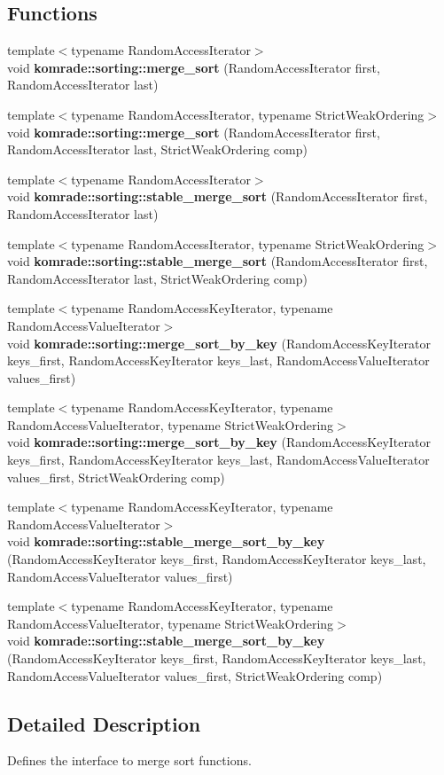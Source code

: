 \subsection*{Functions}
\begin{CompactItemize}
\item 
{\footnotesize template$<$typename RandomAccessIterator$>$ }\\void {\bf komrade::sorting::merge\_\-sort} (RandomAccessIterator first, RandomAccessIterator last)
\item 
{\footnotesize template$<$typename RandomAccessIterator, typename StrictWeakOrdering$>$ }\\void {\bf komrade::sorting::merge\_\-sort} (RandomAccessIterator first, RandomAccessIterator last, StrictWeakOrdering comp)
\item 
{\footnotesize template$<$typename RandomAccessIterator$>$ }\\void {\bf komrade::sorting::stable\_\-merge\_\-sort} (RandomAccessIterator first, RandomAccessIterator last)
\item 
{\footnotesize template$<$typename RandomAccessIterator, typename StrictWeakOrdering$>$ }\\void {\bf komrade::sorting::stable\_\-merge\_\-sort} (RandomAccessIterator first, RandomAccessIterator last, StrictWeakOrdering comp)
\item 
{\footnotesize template$<$typename RandomAccessKeyIterator, typename RandomAccessValueIterator$>$ }\\void {\bf komrade::sorting::merge\_\-sort\_\-by\_\-key} (RandomAccessKeyIterator keys\_\-first, RandomAccessKeyIterator keys\_\-last, RandomAccessValueIterator values\_\-first)
\item 
{\footnotesize template$<$typename RandomAccessKeyIterator, typename RandomAccessValueIterator, typename StrictWeakOrdering$>$ }\\void {\bf komrade::sorting::merge\_\-sort\_\-by\_\-key} (RandomAccessKeyIterator keys\_\-first, RandomAccessKeyIterator keys\_\-last, RandomAccessValueIterator values\_\-first, StrictWeakOrdering comp)
\item 
{\footnotesize template$<$typename RandomAccessKeyIterator, typename RandomAccessValueIterator$>$ }\\void {\bf komrade::sorting::stable\_\-merge\_\-sort\_\-by\_\-key} (RandomAccessKeyIterator keys\_\-first, RandomAccessKeyIterator keys\_\-last, RandomAccessValueIterator values\_\-first)
\item 
{\footnotesize template$<$typename RandomAccessKeyIterator, typename RandomAccessValueIterator, typename StrictWeakOrdering$>$ }\\void {\bf komrade::sorting::stable\_\-merge\_\-sort\_\-by\_\-key} (RandomAccessKeyIterator keys\_\-first, RandomAccessKeyIterator keys\_\-last, RandomAccessValueIterator values\_\-first, StrictWeakOrdering comp)
\end{CompactItemize}


\subsection{Detailed Description}
Defines the interface to merge sort functions. 

